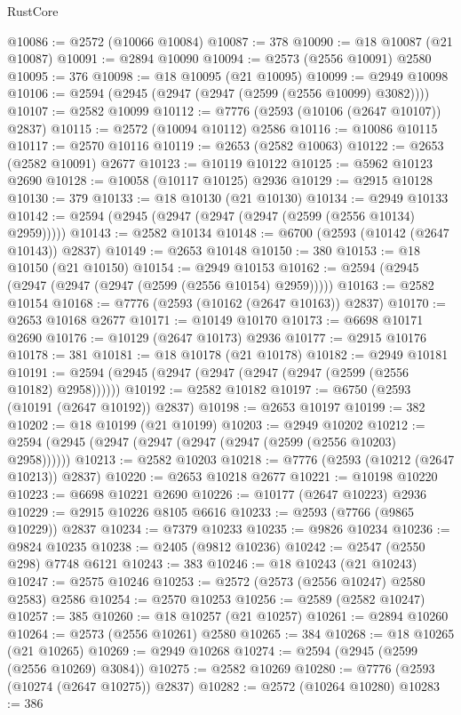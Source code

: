 \begin{lexlean}{RustCore}
\begin{coremodule}
@10086 := @2572 (@10066 @10084)
@10087 := 378
@10090 := @18 @10087 (@21 @10087)
@10091 := @2894 @10090
@10094 := @2573 (@2556 @10091) @2580
@10095 := 376
@10098 := @18 @10095 (@21 @10095)
@10099 := @2949 @10098
@10106 := @2594 (@2945 (@2947 (@2947 (@2599 (@2556 @10099) @3082))))
@10107 := @2582 @10099
@10112 := @7776 (@2593 (@10106 (@2647 @10107)) @2837)
@10115 := @2572 (@10094 @10112) @2586
@10116 := @10086 @10115
@10117 := @2570 @10116
@10119 := @2653 (@2582 @10063)
@10122 := @2653 (@2582 @10091) @2677
@10123 := @10119 @10122
@10125 := @5962 @10123 @2690
@10128 := @10058 (@10117 @10125) @2936
@10129 := @2915 @10128
@10130 := 379
@10133 := @18 @10130 (@21 @10130)
@10134 := @2949 @10133
@10142 := @2594 (@2945 (@2947 (@2947 (@2947 (@2599 (@2556 @10134) @2959)))))
@10143 := @2582 @10134
@10148 := @6700 (@2593 (@10142 (@2647 @10143)) @2837)
@10149 := @2653 @10148
@10150 := 380
@10153 := @18 @10150 (@21 @10150)
@10154 := @2949 @10153
@10162 := @2594 (@2945 (@2947 (@2947 (@2947 (@2599 (@2556 @10154) @2959)))))
@10163 := @2582 @10154
@10168 := @7776 (@2593 (@10162 (@2647 @10163)) @2837)
@10170 := @2653 @10168 @2677
@10171 := @10149 @10170
@10173 := @6698 @10171 @2690
@10176 := @10129 (@2647 @10173) @2936
@10177 := @2915 @10176
@10178 := 381
@10181 := @18 @10178 (@21 @10178)
@10182 := @2949 @10181
@10191 := @2594 (@2945 (@2947 (@2947 (@2947 (@2947 (@2599 (@2556 @10182) @2958))))))
@10192 := @2582 @10182
@10197 := @6750 (@2593 (@10191 (@2647 @10192)) @2837)
@10198 := @2653 @10197
@10199 := 382
@10202 := @18 @10199 (@21 @10199)
@10203 := @2949 @10202
@10212 := @2594 (@2945 (@2947 (@2947 (@2947 (@2947 (@2599 (@2556 @10203) @2958))))))
@10213 := @2582 @10203
@10218 := @7776 (@2593 (@10212 (@2647 @10213)) @2837)
@10220 := @2653 @10218 @2677
@10221 := @10198 @10220
@10223 := @6698 @10221 @2690
@10226 := @10177 (@2647 @10223) @2936
@10229 := @2915 @10226 @8105 @6616
@10233 := @2593 (@7766 (@9865 @10229)) @2837
@10234 := @7379 @10233
@10235 := @9826 @10234
@10236 := @9824 @10235
@10238 := @2405 (@9812 @10236)
@10242 := @2547 (@2550 @298) @7748 @6121
@10243 := 383
@10246 := @18 @10243 (@21 @10243)
@10247 := @2575 @10246
@10253 := @2572 (@2573 (@2556 @10247) @2580 @2583) @2586
@10254 := @2570 @10253
@10256 := @2589 (@2582 @10247)
@10257 := 385
@10260 := @18 @10257 (@21 @10257)
@10261 := @2894 @10260
@10264 := @2573 (@2556 @10261) @2580
@10265 := 384
@10268 := @18 @10265 (@21 @10265)
@10269 := @2949 @10268
@10274 := @2594 (@2945 (@2599 (@2556 @10269) @3084))
@10275 := @2582 @10269
@10280 := @7776 (@2593 (@10274 (@2647 @10275)) @2837)
@10282 := @2572 (@10264 @10280)
@10283 := 386

\end{coremodule}
\end{lexlean}
